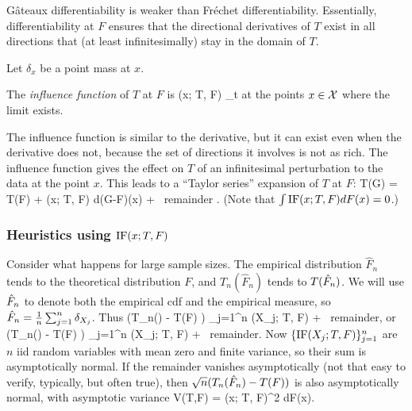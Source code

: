 G\^{a}teaux differentiability is weaker than Fr\'{e}chet differentiability.
Essentially,  \gto  differentiability at $F$ ensures that the directional derivatives
of $T$ exist in all directions that (at least infinitesimally) stay in the domain
of $T$.

Let $\delta_x$ be a point mass at $x$.

\begin{Definition}
    The {\em influence function} of $T$ at $F$ is
    \beq    \label{eq:IFdef}
        \IF(x; T, F)  \equiv \lim_{t }  
    \eeq
    at the points $x \in {\cal X}$ where the limit exists.
\end{Definition}

The influence function is similar to the \gto derivative,
but it can exist even when the \gto derivative does not, because the
set of directions it involves is not as rich.
The influence function gives the effect on $T$ of an infinitesimal perturbation to the data
at the point $x$.
This leads to a ``Taylor series'' expansion of $T$ at $F$:
\beq
    T(G) = T(F) + \int \IF(x; T, F) d(G-F)(x) + \mbox{ remainder} .
\eeq
(Note that $\int {\rm IF}(x; T, F) dF(x) = 0$.)

\subsubsection{Heuristics using ${\rm IF}(x; T, F)$}

Consider what happens for large sample sizes.
The empirical distribution $\hat{F}_n$ tends to the theoretical
distribution $F$, and
$T_n(\hat{F}_n)$ tends to $T({\hat{F}_n})$.
We will use ${\hat{F}_n}$ to denote both the empirical cdf and the
empirical measure, so ${\hat{F}_n} = \frac{1}{n}\sum_{j=1}^n \delta_{X_j}$.
Thus
\beq
    (T_n(\Fhatn) - T(F) ) \approx {} \sum_{j=1}^n \IF(X_j; T, F) + \mbox{ remainder},
\eeq
or
\beq
      (T_n(\Fhatn) - T(F) ) \approx
         \sum_{j=1}^n \IF(X_j; T, F) + \mbox{ remainder}.
\eeq
Now $\{ {\rm IF}(X_j; T, F) \}_{j=1}^n$ are $n$ iid random variables with mean zero
and finite variance, so
their sum is asymptotically normal.  If the remainder vanishes asymptotically
(not that easy to verify, typically, but often true), then
$\sqrt{n}(T_n({\hat{F}_n}) - T(F))$ is also asymptotically normal, with asymptotic variance
\beq    \label{eq:IFasympVar}
    V(T,F) = \int \IF(x; T, F)^2 dF(x).
\eeq

